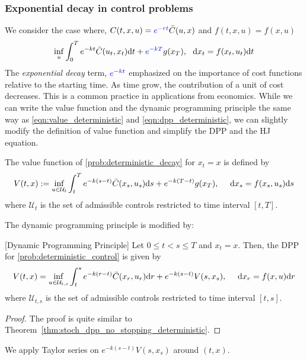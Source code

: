 \documentclass[11pt]{book}
\newcommand{\dt}{\text{\normalfont d}t}
\newcommand{\ds}{\text{\normalfont d}s}
\newcommand{\dr}{\text{\normalfont d}r}
\newcommand{\dx}{\text{\normalfont d}x}
\begin{document}
\subsubsection{Exponential decay in control problems}
We consider the case where, $C(t,x,u)={\color{blue}e^{-r t}}\bar{C}(u,x)$ and $f(t,x,u)=f(x,u)$
\begin{equation}
\label{prob:deterministic_decay}
    \inf_{u}\int_0^T e^{-k t}\bar{C}(u_t,x_t)\dt + {\color{blue}e^{-k T}}g(x_T),~~\dx_t=f(x_t,u_t)\dt
\end{equation}
The \emph{exponential decay} term, ${\color{blue}e^{-kt}}$ emphasized on the importance of cost functions relative to the starting time. As time grow, the contribution of a unit of cost decreases. This is a common practice in applications from economics. While we can write the value function and the dynamic programming principle the same way as \eqref{eqn:value_deterministic} and \eqref{eqn:dpp_deterministic}, we can slightly modify the definition of value function and simplify the DPP and the HJ equation.
\begin{defn}
The value function of \eqref{prob:deterministic_decay} for $x_t=x$ is defined by
\begin{equation}\label{eqn:value_deterministic_decay}
    V(t,x):= \inf_{u\in\mathcal{U}_{t}}\int_t^Te^{-k(s-t)}\bar{C}(x_s,u_s){{\ds}}+e^{-k(T-t)}g(x_T),~~~~{\dx}_s=f(x_s,u_s){{\ds}}
\end{equation}
where $\mathcal{U}_{t}$ is the set of admissible controls restricted to time interval $[t,T]$.
\end{defn}
The dynamic programming principle is modified by:
\begin{thm}\label{thm:stoch_dpp_no_stopping_deterministic_decay}
    [Dynamic Programming Principle]
    Let $0\le t<s\le T$ and $x_t=x$. Then, the DPP for \eqref{prob:deterministic_control} is given by 
    \begin{equation} \label{eqn:dpp_deterministic_decay}
    V(t,x) =\inf_{u\in\mathcal{U}_{t,s}}\int_t^s e^{-k(r-t)}\bar{C}(x_r,u_r){{\dr}}+e^{-k(s-t)}V(s,x_s),~~~~{\dx}_r=f(x,u){{\dr}}
\end{equation}
where $\mathcal{U}_{t,s}$ is the set of admissible controls restricted to time interval $[t,s]$.
\end{thm}
\begin{proof}
    The proof is quite similar to Theorem~\ref{thm:stoch_dpp_no_stopping_deterministic}.
\end{proof}
    We apply Taylor series on $e^{-k(s-t)}V(s,x_s)$ around $(t,x)$.
\end{document}
